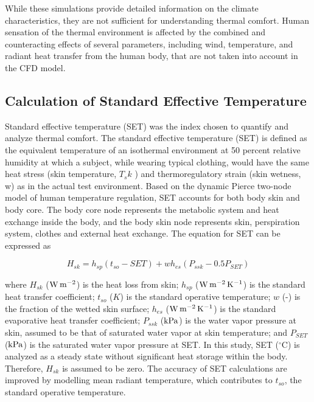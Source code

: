 \documentclass[preprint,3p,12pt,english]{elsarticle}
\begin{document}
While these simulations provide detailed information on the climate characteristics, they are not sufficient for understanding thermal comfort. Human sensation of the thermal environment is affected by the combined and counteracting effects of several parameters, including wind, temperature, and radiant heat transfer from the human body, that are not taken into account in the CFD model. 

\vspace{3ex}

\subsection{Calculation of Standard Effective Temperature}
Standard effective temperature (SET) was the index chosen to quantify and analyze thermal comfort. The standard effective temperature (SET) is defined as the equivalent temperature of an isothermal environment at 50 percent relative humidity at which a subject, while wearing typical clothing, would have the same heat stress (skin temperature, $T_sk$ ) and thermoregulatory strain (skin wetness, w) as in the actual test environment. Based on the dynamic Pierce two-node model of human temperature regulation, SET accounts for both body skin and body core. The body core node represents the metabolic system and heat exchange inside the body, and the body skin node represents skin, perspiration system, clothes and external heat exchange. The equation for SET can be expressed as \cite{gagge1986standard}

\begin{equation}
H_{sk}=h_{sp}(t_{so}-SET)+wh_{es}(P_{ssk}-0.5P_{SET})
\label{Eqa.SET}
\end{equation}

where $H_{sk}$ ($\rm W\, m^{-2}$) is the heat loss from skin; $h_{sp}$ ($\rm W\, m^{-2}\,K^{-1}$) is the standard heat transfer coefficient; $t_{so}$ ($K$) is the standard operative temperature; $w$ (-) is the fraction of the wetted skin surface; $h_{es}$ ($\rm W\, m^{-2}\,K^{-1}$) is the standard evaporative heat transfer coefficient; $P_{ssk}$ ($\rm kPa$) is the water vapor pressure at skin, assumed to be that of saturated water vapor at skin temperature; and $P_{SET}$ ($\rm kPa$) is the saturated water vapor pressure at SET. In this study, SET ($^{\circ}$C) is analyzed as a steady state without significant heat storage within the body. Therefore, $H_{sk}$ is assumed to be zero. The accuracy of SET calculations are improved by modelling mean radiant temperature, which contributes to $t_{so}$, the standard operative temperature. 
\end{document}
